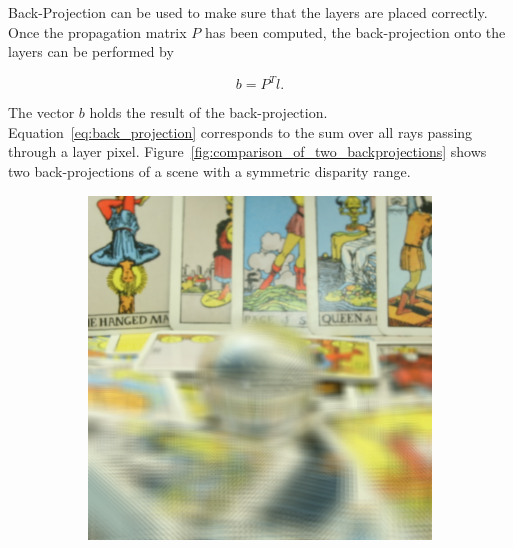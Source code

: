\documentclass[11pt,a4paper,titlepage]{article}
\begin{document}
Back-Projection can be used to make sure that the layers are placed correctly. Once the propagation matrix $P$ has been computed, the back-projection onto the layers can be performed by

\begin{equation} \label{eq:back_projection}
	b = P^T l.
\end{equation}

The vector $b$ holds the result of the back-projection. Equation~\ref{eq:back_projection} corresponds to the sum over all rays passing through a layer pixel. Figure~\ref{fig:comparison_of_two_backprojections} shows two back-projections of a scene with a symmetric disparity range.

\begin{figure}
	\centering
	\begin{subfigure}[t]{0.19\textwidth}
		\includegraphics[width=\textwidth]{results/tarot_back_projection/sensorPlaneZ=-0.5/Back_Projection_layer_1.png} 
	\end{subfigure}%
	~
	\begin{subfigure}[t]{0.19\textwidth}

\end{subfigure}
\end{figure}
\end{document}
